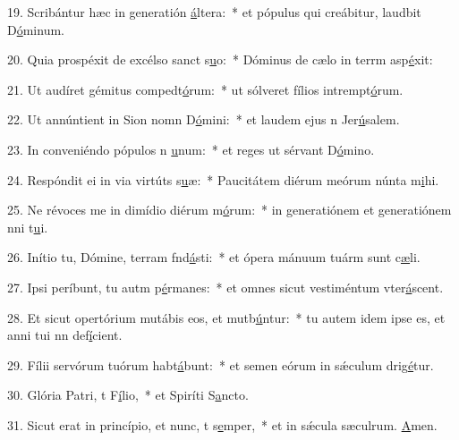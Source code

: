 19. Scribántur hæc in generatión \uline{á}ltera:~* et pópulus qui creábitur, laudbit D\uline{ó}minum.\par 
20. Quia prospéxit de excélso sanct s\uline{u}o:~* Dóminus de cælo in terrm asp\uline{é}xit:\par 
21. Ut audíret gémitus compedt\uline{ó}rum:~* ut sólveret fílios intrempt\uline{ó}rum.\par 
22. Ut annúntient in Sion nomn D\uline{ó}mini:~* et laudem ejus n Jer\uline{ú}salem.\par 
23. In conveniéndo pópulos n \uline{u}num:~* et reges ut sérvant D\uline{ó}mino.\par 
24. Respóndit ei in via virtúts s\uline{u}æ:~* Paucitátem diérum meórum núnta m\uline{i}hi.\par 
25. Ne révoces me in dimídio diérum m\uline{ó}rum:~* in generatiónem et generatiónem nni t\uline{u}i.\par 
26. Inítio tu, Dómine, terram fnd\uline{á}sti:~* et ópera mánuum tuárm sunt c\uline{æ}li.\par 
27. Ipsi períbunt, tu autm p\uline{é}rmanes:~* et omnes sicut vestiméntum vter\uline{á}scent.\par 
28. Et sicut opertórium mutábis eos, et mutb\uline{ú}ntur:~* tu autem idem ipse es, et anni tui nn def\uline{í}cient.\par 
29. Fílii servórum tuórum habt\uline{á}bunt:~* et semen eórum in sǽculum drig\uline{é}tur.\par 
30. Glória Patri, t F\uline{í}lio,~* et Spiríti S\uline{a}ncto.\par 
31. Sicut erat in princípio, et nunc, t s\uline{e}mper,~* et in sǽcula sæculrum. \uline{A}men.\par 
